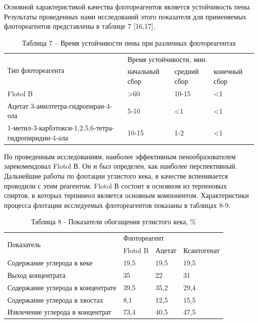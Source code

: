 \begin{multicols}{2}
Основной характеристикой качества флотореагентов является устойчивость
пены. Результаты проведенных нами исследований этого показателя для
применяемых флотореагентов представлены в таблице 7 {[}16,17{]}.
\end{multicols}

\begin{table}[H]
\caption*{Таблица 7 -- Время устойчивости пены при различных флотореагентах}
\centering
\begin{tabular}{|p{}|lll|}
\hline
\multirow{2}{*}{Тип флотореагента} & \multicolumn{3}{l|}{Время устойчивости, мин.} \\ \cline{2-4}
 & \multicolumn{1}{l|}{начальный сбор} & \multicolumn{1}{l|}{средний сбор} & конечный сбор \\ \hline
Flotol B & \multicolumn{1}{l|}{\textgreater{}60} & \multicolumn{1}{l|}{10-15} & \textless{}1 \\ \hline
Ацетат 3-амилтетра-гидропиран-4-ола & \multicolumn{1}{l|}{5-10} & \multicolumn{1}{l|}{\textless{}1} & \textless{}1 \\ \hline
1-метил-3-карбэтокси-1,2,5,6-тетра-гидропиридин-4-ола & \multicolumn{1}{l|}{10-15} & \multicolumn{1}{l|}{1-2} & \textless{}1 \\ \hline
\end{tabular}
\end{table}

\begin{multicols}{2}
По проведенным исследованиям, наиболее эффективным пенообразователем
зарекомендовал Flotol В. Он и был определен, как наиболее перспективный.
Дальнейшие работы по флотации углистого кека, в качестве вспенивается
проводили с этим реагентом. Flotol В состоит в основном из терпеновых
спиртов, в которых терпинеол является основным компонентом.
Характеристики процесса флотации исследуемых флотореагентов показаны в
таблицах 8-9.
\end{multicols}

\begin{table}[H]
\caption*{Таблица 8 - Показатели обогащения углистого кека, \%}
\centering
\begin{tabular}{|l|lll|}
\hline
\multirow{2}{*}{Показатель} & \multicolumn{3}{l|}{Флотореагент} \\ \cline{2-4}
 & \multicolumn{1}{l|}{Flotol B} & \multicolumn{1}{l|}{Ацетат} & Ксантогенат \\ \hline
Содержание углерода в кеке & \multicolumn{1}{l|}{19,5} & \multicolumn{1}{l|}{19,5} & 19,5 \\ \hline
Выход концентрата & \multicolumn{1}{l|}{35} & \multicolumn{1}{l|}{22} & 31 \\ \hline
Содержание углерода в концентрате & \multicolumn{1}{l|}{39,5} & \multicolumn{1}{l|}{35,2} & 29,4 \\ \hline
Содержание углерода в хвостах & \multicolumn{1}{l|}{8,1} & \multicolumn{1}{l|}{12,5} & 15,5 \\ \hline
Извлечение углерода в концентрат & \multicolumn{1}{l|}{73,4} & \multicolumn{1}{l|}{40,5} & 47,5 \\ \hline
\end{tabular}
\end{table}

